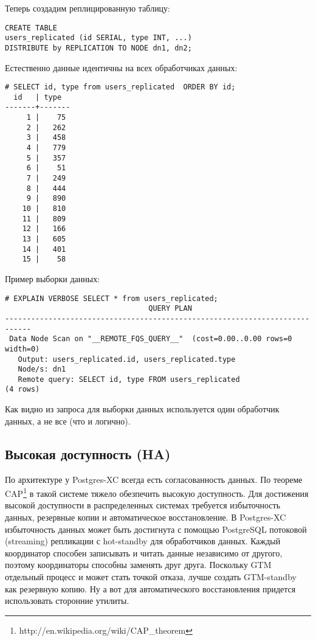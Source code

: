 Теперь создадим реплицированную таблицу:

\begin{lstlisting}[label=lst:postgres-xc20,caption=Создание реплицированной таблицы]
CREATE TABLE 
users_replicated (id SERIAL, type INT, ...) 
DISTRIBUTE by REPLICATION TO NODE dn1, dn2;
\end{lstlisting}

Естественно данные идентичны на всех обработчиках данных:

\begin{lstlisting}[label=lst:postgres-xc21,caption=Данные с координатора и обработчиков данных]
# SELECT id, type from users_replicated  ORDER BY id;
  id   | type  
-------+-------
     1 |    75
     2 |   262
     3 |   458
     4 |   779
     5 |   357
     6 |    51
     7 |   249
     8 |   444
     9 |   890
    10 |   810
    11 |   809
    12 |   166
    13 |   605
    14 |   401
    15 |    58
\end{lstlisting} 

Пример выборки данных:

\begin{lstlisting}[label=lst:postgres-xc22,caption=Выборка записей из реплицированной таблицы]
# EXPLAIN VERBOSE SELECT * from users_replicated;
                                 QUERY PLAN                                 
----------------------------------------------------------------------------
 Data Node Scan on "__REMOTE_FQS_QUERY__"  (cost=0.00..0.00 rows=0 width=0)
   Output: users_replicated.id, users_replicated.type
   Node/s: dn1
   Remote query: SELECT id, type FROM users_replicated
(4 rows)
\end{lstlisting}

Как видно из запроса для выборки данных используется один обработчик данных, а не все (что и логично).

\subsection{Высокая доступность (HA)}

По архитектуре у Postgres-XC всегда есть согласованность данных. По теореме CAP\footnote{http://en.wikipedia.org/wiki/CAP\_theorem} в такой системе тяжело обезпечить высокую доступность. Для достижения высокой доступности в распределенных системах требуется избыточность данных, резервные копии и автоматическое восстановление. В Postgres-XC избыточность данных может быть достигнута с помощью PostgreSQL потоковой (streaming) репликации с hot-standby для обработчиков данных. Каждый координатор способен записывать и читать данные независимо от другого, поэтому координаторы способны заменять друг друга. Поскольку GTM отдельный процесс и может стать точкой отказа, лучше создать GTM-standby как резервную копию. Ну а вот для автоматического восстановления придется использовать сторонние утилиты.

